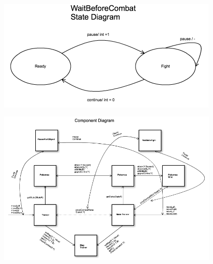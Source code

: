 \documentclass[a4paper,10pt]{article}
\begin{document}
\begin{figure}[h!]
      \begin{center}
      \includegraphics[scale=1]{State_diag_WBC.png}
      \end{center}
      \end{figure}
\begin{landscape}
\begin{figure}[h!]
      \begin{center}
     \includegraphics[scale=0.98]{Component_diag.png}
      \end{center}
      \end{figure}
      \end{landscape}
\end{document}
